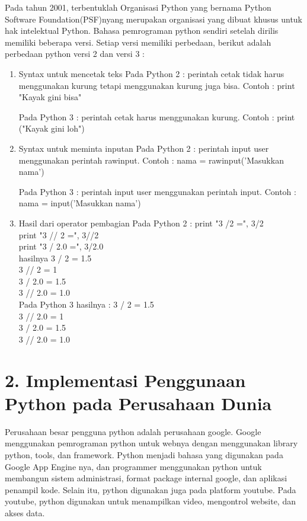 Pada tahun 2001, terbentuklah Organisasi Python yang bernama Python Software Foundation(PSF)nyang merupakan organisasi yang dibuat khusus untuk hak intelektual Python. Bahasa pemrograman python sendiri setelah dirilis memiliki beberapa versi. Setiap versi memiliki perbedaan, berikut adalah perbedaan python versi 2 dan versi 3 :
\begin{enumerate}[label=\alph*.]
\item Syntax untuk mencetak teks
Pada Python 2 : perintah cetak tidak harus menggunakan kurung tetapi menggunakan kurung juga bisa.
Contoh :
print "Kayak gini bisa"

Pada Python 3 : perintah cetak harus menggunakan kurung.
Contoh :
print ("Kayak gini loh")

\item Syntax untuk meminta inputan
Pada Python 2 : perintah input user menggunakan perintah raw\textunderscore input.
Contoh : 
nama = raw\textunderscore input('Masukkan nama')

Pada Python 3 : perintah input user menggunakan perintah input.
Contoh :
nama = input('Masukkan nama')

\item Hasil dari operator pembagian
Pada Python 2 :
print "3 /2 =", 3/2\\
print "3 // 2 =", 3//2\\
print "3 / 2.0 =", 3/2.0\\

hasilnya
3 / 2 = 1.5\\
3 // 2 = 1\\
3 / 2.0 = 1.5\\
3 // 2.0 = 1.0\\

Pada Python 3 hasilnya :
3 / 2 = 1.5\\
3 // 2.0 = 1\\
3 / 2.0 = 1.5\\
3 // 2.0 = 1.0\\

\end{enumerate}

\section*{\normalsize 2. Implementasi Penggunaan Python pada Perusahaan Dunia}
\hspace{\parindent}Perusahaan besar pengguna python adalah perusahaan google. Google menggunakan pemrograman python untuk webnya dengan menggunakan library python, tools, dan framework. Python menjadi bahasa yang digunakan pada Google App Engine nya, dan programmer menggunakan python untuk membangun sistem administrasi, format package internal google, dan aplikasi penampil kode. Selain itu, python digunakan juga pada platform youtube. Pada youtube, python digunakan untuk menampilkan video, mengontrol website, dan akses data.

